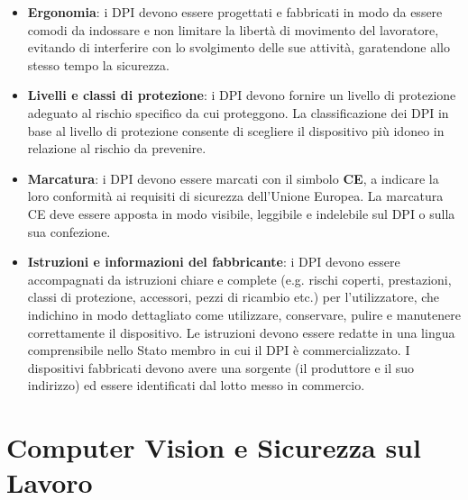 \begin{itemize}
    \item \textbf{Ergonomia}: i DPI devono essere progettati e fabbricati in modo da essere comodi da indossare e non limitare la libertà di movimento del lavoratore, evitando di interferire con lo svolgimento delle sue attività, garatendone allo stesso tempo la sicurezza. 
    
    \item \textbf{Livelli e classi di protezione}: i DPI devono fornire un livello di protezione adeguato al rischio specifico da cui proteggono. La classificazione dei DPI in base al livello di protezione consente di scegliere il dispositivo più idoneo in relazione al rischio da prevenire.
    
    \item \textbf{Marcatura}: i DPI devono essere marcati con il simbolo \textbf{CE}, a indicare la loro conformità ai requisiti di sicurezza dell'Unione Europea. La marcatura CE deve essere apposta in modo visibile, leggibile e indelebile sul DPI o sulla sua confezione.

    \item \textbf{Istruzioni e informazioni del fabbricante}: i DPI devono essere accompagnati da istruzioni chiare e complete (e.g. rischi coperti, prestazioni, classi di protezione, accessori, pezzi di ricambio etc.) per l'utilizzatore, che indichino in modo dettagliato come utilizzare, conservare, pulire e manutenere correttamente il dispositivo. Le istruzioni devono essere redatte in una lingua comprensibile nello Stato membro in cui il DPI è commercializzato. I dispositivi fabbricati devono avere una sorgente (il produttore e il suo indirizzo) ed essere identificati dal lotto messo in commercio.
\end{itemize} 

\section{Computer Vision e Sicurezza sul Lavoro}

